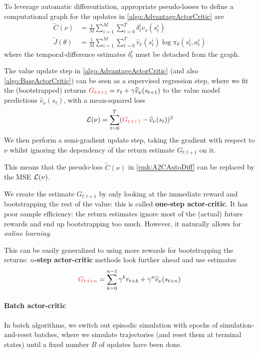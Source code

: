 \documentclass[../course-notes.tex]{subfiles}
\begin{document}
\begin{remark}\label{rmk:A2CAutoDiff}
	To leverage automatic differentiation, appropriate pseudo-losses to define a computational graph for the updates in \cref{algo:AdvantageActorCritic} are
	\begin{subequations}
	\begin{align}
	\tilde{C}(\nu) &= \frac{1}{M}\sum_{i=1}^M
	\sum_{t=0}^T\delta^i_t  \widehat{v}_\nu(s^i_t)  \\
	\tilde{J}(\theta) &=
	\frac{1}{M}\sum_{i=1}^M
	\sum_{t=0}^T \widehat{v}_\nu(s^i_t) \log\pi_\theta(s^i_t,a^i_t)
	\end{align}
	\end{subequations}
	where the temporal-difference estimates $\delta^i_t$ must be detached from the graph.
\end{remark}


The value update step in \cref{algo:AdvantageActorCritic} (and also \cref{algo:BaseActorCritic}) can be seen as a supervised regression step, where we fit the (bootstrapped) returns ${\redfont G_{t:t+1}} = r_t + \gamma\widehat{v}_\nu(s_{t+1})$ to the value model predictions $\widehat{v}_\nu(s_t)$, with a mean-squared loss
\[
	\calL(\nu) =
	\sum_{t=0}^T ({\redfont G_{t:t+1}} - \widehat{v}_{\nu}(s_t))^2
\]
We then perform a semi-gradient update step, taking the gradient with respect to $\nu$ whilst ignoring the dependency of the return estimate $G_{t:t+1}$ on it.

\begin{remark}
This means that the pseudo-loss $\tilde{C}(\nu)$ in \cref{rmk:A2CAutoDiff} can be replaced by the MSE $\mathcal{L}(\nu)$.
\end{remark}


We create the estimate $G_{t:t+1}$ by only looking at the immediate reward and bootstrapping the rest of the value: this is called \textbf{one-step actor-critic}. It has poor sample efficiency: the return estimates ignore most of the (actual) future rewards and end up bootstrapping too much. However, it naturally allows for \textit{online learning}.	

This can be easily generalized to using more rewards for bootstrapping the returns: \textbf{$n$-step actor-critic} methods look further ahead and use estimates 
\[
	{\redfont G_{t:t+n}}
	= \sum_{k=0}^{n-1}\gamma^k r_{t+k} + \gamma^n \widehat{v}_\nu(s_{t+n})
\]


\paragraph{Batch actor-critic} In batch algorithms, we switch out episodic simulation with epochs of simulation-and-reset batches, where we simulate trajectories (and reset them at terminal states) until a fixed number $B$ of updates have been done.
\end{document}
